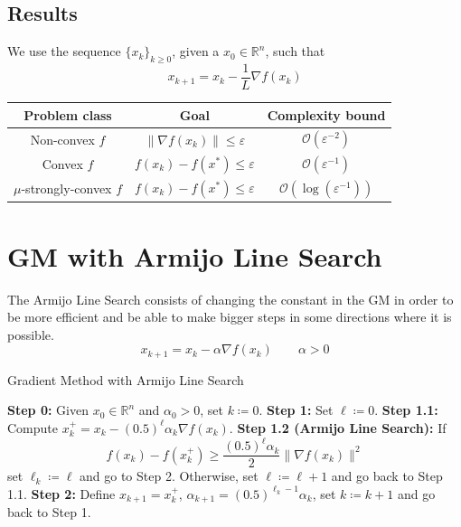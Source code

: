 \documentclass[12pt, openany]{report}
\theoremstyle{definition}
\begin{document}
\subsection{Results}
We use the sequence \(\{x_k\}_{k\ge 0}\), given a \(x_0\in \mathbb{R}^n\), such that \[x_{k+1} = x_k - \frac{1}{L}\nabla f(x_k)\]
\begin{center}
    \renewcommand{\arraystretch}{1.5}
    \begin{tabular}{c|c|c}\label{tab:complexity}
    Problem class & Goal & Complexity bound \\ \hline\hline
    Non-convex \(f\) & \(\lVert \nabla f(x_k)\rVert \le \varepsilon\) & \(\mathcal{O}(\varepsilon^{-2})\)\\ \hline
    Convex \(f\) & \(f(x_k)-f(x^*)\le \varepsilon\) & \(\mathcal{O}(\varepsilon^{-1})\)\\ \hline
    \(\mu\)-strongly-convex \(f\) & \(f(x_k)-f(x^*)\le \varepsilon\) & \(\mathcal{O}(\log (\varepsilon^{-1}))\)
\end{tabular}
\end{center}
\section{GM with Armijo Line Search}\label{sec:armijo}
The Armijo Line Search consists of changing the constant in the GM in order to be more efficient and be able to make bigger steps in some directions where it is possible. 
\begin{equation}
    x_{k+1} = x_k - \alpha \nabla f(x_k)\qquad \alpha >0
\end{equation}
\begin{algorithm}
    \caption{Gradient Method with Armijo Line Search}\label{algo:Armijo}
    \begin{algorithmic}[1]
    \State \textbf{Step 0:} Given $x_0 \in \mathbb{R}^n$ and $\alpha_0 > 0$, set $k \coloneqq 0$.
    \State \textbf{Step 1:} Set $\ell \coloneqq 0$.
    \State \textbf{Step 1.1:} Compute $x_k^+ = x_k - (0.5)^\ell \alpha_k \nabla f(x_k)$.
    \State \textbf{Step 1.2 (Armijo Line Search):} If
    \[
    f(x_k) - f(x_k^+) \geq \frac{(0.5)^\ell \alpha_k}{2} \|\nabla f(x_k)\|^2 \tag{1}
    \]
    set $\ell_k \coloneqq \ell$ and go to Step 2. Otherwise, set $\ell \coloneqq \ell + 1$ and go back to Step 1.1.
    \State \textbf{Step 2:} Define $x_{k+1} = x_k^+$, $\alpha_{k+1} = (0.5)^{\ell_k - 1} \alpha_k$, set $k \coloneqq k + 1$ and go back to Step 1.
    \end{algorithmic}
\end{algorithm}
\end{document}
